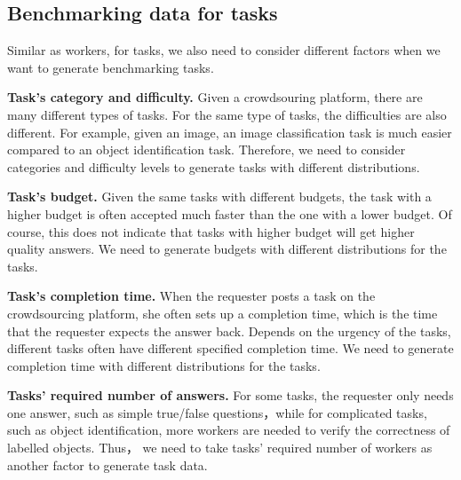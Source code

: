 \subsection{Benchmarking data for tasks}

Similar as workers, for tasks, we also need to consider different factors when we want to generate benchmarking tasks.

\textbf{Task's category and difficulty. } Given a crowdsouring platform, there are many different types of tasks. For the same type of tasks, the difficulties are also different. For example, given an image, an image classification task is much easier compared to an object identification task.  Therefore, we need to consider categories and difficulty levels to generate tasks with different distributions.

\textbf{Task's budget. }  Given the same tasks with different budgets,  the task with a higher budget is often accepted much faster than the one with a lower budget. Of course, this does not indicate that tasks with higher budget will get higher quality answers.  We need to generate budgets with different distributions for the tasks.

\textbf{Task's completion time. } When the requester posts a task on the crowdsourcing platform, she often sets up a completion time, which is the time that the requester expects the answer back. Depends on the urgency of the tasks,  different tasks often have different specified completion time. We need to generate completion time with different distributions for the tasks.

\textbf{Tasks' required number of answers. } For some tasks, the requester only needs one answer, such as simple true/false questions，while for complicated tasks, such as object identification, more workers are needed to verify the correctness of labelled objects.  Thus， we need to take tasks' required number of workers as another factor to generate task data.
